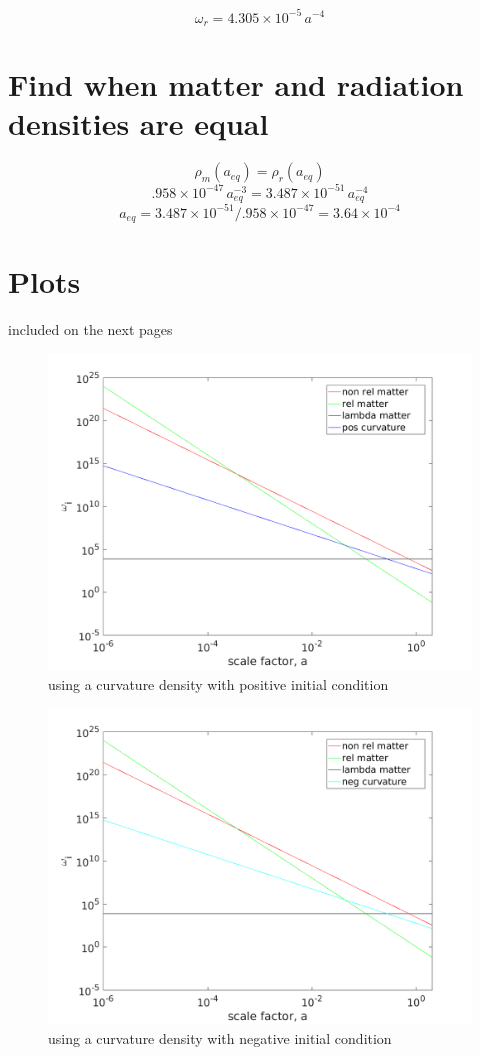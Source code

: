 \documentclass[12pt]{article}
\begin{document}
$$ \omega_{r} = 4.305 \times 10^{-5} \, a^{-4} $$

\section{Find when matter and radiation densities are equal}
$$\rho_{m}(a_{eq}) = \rho_{r}(a_{eq})$$
$$ .958 \times 10^{-47} \, a_{eq}^{-3} =  3.487 \times 10^{-51}  \, a_{eq}^{-4}$$
$$ a_{eq} = 3.487 \times 10^{-51} / .958 \times 10^{-47} = 3.64 \times 10^{-4}$$

\section{Plots}
\FloatBarrier
included on the next pages
\begin{figure}
\centering
\includegraphics[width=6in]{rho_k_pos.png}
\caption{using a curvature density with positive initial condition}
\end{figure}

\begin{figure}
\centering
\includegraphics[width=6in]{rho_k_neg.png}
\caption{using a curvature density with negative initial condition}
\end{figure}
\end{document}
